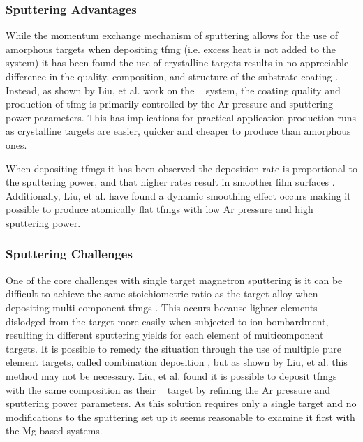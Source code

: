 \documentclass[a4paper,12pt,oneside]{report}%
\begin{document}
\subsubsection{Sputtering Advantages}
While the momentum exchange mechanism of sputtering allows for the use of amorphous targets when depositing \gls{tfmg} (i.e. excess heat is not added to the system) it has been found the use of crystalline targets results in no appreciable difference in the quality, composition, and structure of the substrate coating  \cite{Liu2012}. Instead, as shown by Liu, et al. \cite{Liu2012} work on the \ZrCuNiAl~ system, the coating quality and production of \gls{tfmg} is primarily controlled by the Ar pressure and sputtering power parameters. This has implications for practical application production runs as crystalline targets are easier, quicker and cheaper to produce than amorphous ones. 

When depositing \glspl{tfmg} it has been observed the deposition rate is proportional to the sputtering power, and that higher rates result in smoother film surfaces \cite{Cao2013, Liu2012}. Additionally, Liu, et al. \cite{Liu2012} have found a dynamic smoothing effect occurs making it possible to produce atomically flat \glspl{tfmg} with low Ar pressure and high sputtering power. 

\subsubsection{Sputtering Challenges}
One of the core challenges with single target magnetron sputtering is it can be difficult to achieve the same stoichiometric ratio as the target alloy when depositing multi-component \glspl{tfmg} \cite{Cao2013, Liu2012, Kondoh2008, Kowalski1983}. This occurs because lighter elements dislodged from the target more easily when subjected to ion bombardment, resulting in different sputtering yields for each element of multicomponent targets. It is possible to remedy the situation through the use of multiple pure element targets, called combination deposition \cite{Deng2007, Qin2009, Apreutesei2014}, but as shown by Liu, et al. \cite{Liu2012} this method may not be necessary. Liu, et al. \cite{Liu2012} found it is possible to deposit \glspl{tfmg} with the same composition as their \ZrCuNiAl~ target by refining the Ar pressure and sputtering power parameters. As this solution requires only a single target and no modifications to the sputtering set up it seems reasonable to examine it first with the Mg based systems. 
\end{document}
